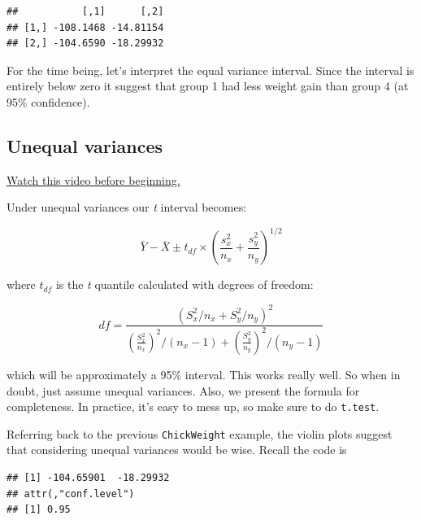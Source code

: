 \documentclass[]{article}
\newenvironment{Shaded}{\begin{snugshade}}{\end{snugshade}}
\newcommand{\KeywordTok}[1]{\textcolor[rgb]{0.13,0.29,0.53}{\textbf{{#1}}}}
\newcommand{\DataTypeTok}[1]{\textcolor[rgb]{0.13,0.29,0.53}{{#1}}}
\newcommand{\StringTok}[1]{\textcolor[rgb]{0.31,0.60,0.02}{{#1}}}
\newcommand{\OtherTok}[1]{\textcolor[rgb]{0.56,0.35,0.01}{{#1}}}
\newcommand{\NormalTok}[1]{{#1}}
\begin{document}
\begin{verbatim}
##           [,1]      [,2]
## [1,] -108.1468 -14.81154
## [2,] -104.6590 -18.29932
\end{verbatim}

For the time being, let's interpret the equal variance interval. Since
the interval is entirely below zero it suggest that group 1 had less
weight gain than group 4 (at 95\% confidence).

\subsection{Unequal variances}\label{unequal-variances}

\href{https://www.youtube.com/watch?v=CVDdbR4VuOE\&list=PLpl-gQkQivXiBmGyzLrUjzsblmQsLtkzJ\&index=24}{Watch
this video before beginning.}

Under unequal variances our \emph{t} interval becomes:

\[
\bar Y - \bar X \pm t_{df} \times \left(\frac{s_x^2}{n_x} + \frac{s_y^2}{n_y}\right)^{1/2}
\]

where $t_{df}$ is the \emph{t} quantile calculated with degrees of
freedom:

\[
df=    \frac{\left(S_x^2 / n_x + S_y^2/n_y\right)^2}
    {\left(\frac{S_x^2}{n_x}\right)^2 / (n_x - 1) +
      \left(\frac{S_y^2}{n_y}\right)^2 / (n_y - 1)}
\]

which will be approximately a 95\% interval. This works really well. So
when in doubt, just assume unequal variances. Also, we present the
formula for completeness. In practice, it's easy to mess up, so make
sure to do \texttt{t.test}.

Referring back to the previous \texttt{ChickWeight} example, the violin
plots suggest that considering unequal variances would be wise. Recall
the code is

\begin{Shaded}
\end{Shaded}

\begin{verbatim}
## [1] -104.65901  -18.29932
## attr(,"conf.level")
## [1] 0.95
\end{verbatim}
\end{document}
